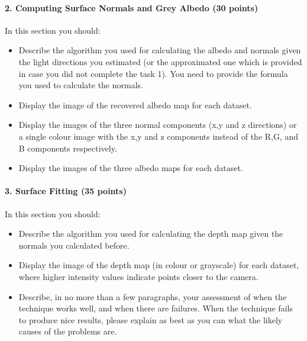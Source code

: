 \documentclass{paper}
\begin{document}
\paragraph{2. Computing Surface Normals and Grey Albedo (30 points)}

In this section you should:

\begin{itemize}
\item Describe the algorithm you used for calculating the albedo and normals given the light directions you estimated (or the approximated one which is provided in case you did not complete the task 1). You need to provide the formula you used to calculate the normals.

\item Display the image of the recovered albedo map for each dataset.
\item Display the images of the three normal components (x,y and z directions) or a single colour image with the x,y and z components instead of the R,G, and B components respectively.
\item Display the images of the three albedo maps for each dataset. 
\end{itemize}



\paragraph{3. Surface Fitting (35 points)}

In this section you should:

\begin{itemize}
\item Describe the algorithm you used for calculating the depth map given the normals you calculated before.
\item Display the image of the depth map (in colour or grayscale) for each dataset, where higher intensity values indicate points closer to the camera.
\item Describe, in no more than a few paragraphs, your assessment of when the technique works well, and when there are failures. When the technique fails to produce nice results, please explain as best as you can what the likely causes of the problems are.
\end{itemize}















 
\end{document}
